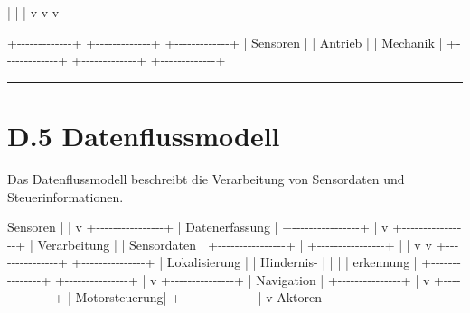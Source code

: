 \documentclass[
]{article}
\newenvironment{Shaded}{}{}
\newcommand{\NormalTok}[1]{#1}
\begin{document}
\begin{Shaded}
\begin{Highlighting}[]
\NormalTok{        |                     |                     |}
\NormalTok{        v                     v                     v}

\NormalTok{+{-}{-}{-}{-}{-}{-}{-}{-}{-}{-}{-}{-}{-}+       +{-}{-}{-}{-}{-}{-}{-}{-}{-}{-}{-}{-}{-}+       +{-}{-}{-}{-}{-}{-}{-}{-}{-}{-}{-}{-}{-}+}
\NormalTok{| Sensoren    |       | Antrieb     |       | Mechanik    |}
\NormalTok{+{-}{-}{-}{-}{-}{-}{-}{-}{-}{-}{-}{-}{-}+       +{-}{-}{-}{-}{-}{-}{-}{-}{-}{-}{-}{-}{-}+       +{-}{-}{-}{-}{-}{-}{-}{-}{-}{-}{-}{-}{-}+}
\end{Highlighting}
\end{Shaded}

\begin{center}\rule{0.5\linewidth}{0.5pt}\end{center}

\section{D.5 Datenflussmodell}\label{d.5-datenflussmodell}

Das Datenflussmodell beschreibt die Verarbeitung von Sensordaten und
Steuerinformationen.

\begin{Shaded}
\begin{Highlighting}[]
\NormalTok{Sensoren}
\NormalTok{   |}
\NormalTok{   |}
\NormalTok{   v}
\NormalTok{+{-}{-}{-}{-}{-}{-}{-}{-}{-}{-}{-}{-}{-}{-}{-}{-}+}
\NormalTok{| Datenerfassung |}
\NormalTok{+{-}{-}{-}{-}{-}{-}{-}{-}{-}{-}{-}{-}{-}{-}{-}{-}+}
\NormalTok{        |}
\NormalTok{        v}
\NormalTok{+{-}{-}{-}{-}{-}{-}{-}{-}{-}{-}{-}{-}{-}{-}{-}{-}+}
\NormalTok{| Verarbeitung   |}
\NormalTok{| Sensordaten    |}
\NormalTok{+{-}{-}{-}{-}{-}{-}{-}{-}{-}{-}{-}{-}{-}{-}{-}{-}+}
\NormalTok{        |}
\NormalTok{        +{-}{-}{-}{-}{-}{-}{-}{-}{-}{-}{-}{-}{-}{-}{-}{-}+}
\NormalTok{        |                |}
\NormalTok{        v                v}
\NormalTok{+{-}{-}{-}{-}{-}{-}{-}{-}{-}{-}{-}{-}{-}{-}{-}+  +{-}{-}{-}{-}{-}{-}{-}{-}{-}{-}{-}{-}{-}{-}{-}+}
\NormalTok{| Lokalisierung |  | Hindernis{-}    |}
\NormalTok{|               |  | erkennung     |}
\NormalTok{+{-}{-}{-}{-}{-}{-}{-}{-}{-}{-}{-}{-}{-}{-}{-}+  +{-}{-}{-}{-}{-}{-}{-}{-}{-}{-}{-}{-}{-}{-}{-}+}
\NormalTok{        |}
\NormalTok{        v}
\NormalTok{+{-}{-}{-}{-}{-}{-}{-}{-}{-}{-}{-}{-}{-}{-}{-}+}
\NormalTok{| Navigation    |}
\NormalTok{+{-}{-}{-}{-}{-}{-}{-}{-}{-}{-}{-}{-}{-}{-}{-}+}
\NormalTok{        |}
\NormalTok{        v}
\NormalTok{+{-}{-}{-}{-}{-}{-}{-}{-}{-}{-}{-}{-}{-}{-}{-}+}
\NormalTok{| Motorsteuerung|}
\NormalTok{+{-}{-}{-}{-}{-}{-}{-}{-}{-}{-}{-}{-}{-}{-}{-}+}
\NormalTok{        |}
\NormalTok{        v}
\NormalTok{     Aktoren}
\end{Highlighting}
\end{Shaded}
\end{document}
